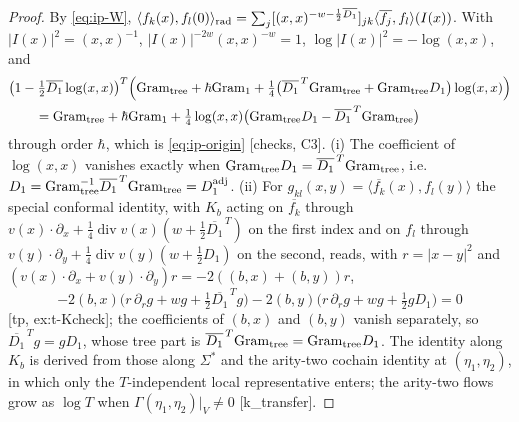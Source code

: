\documentclass[11pt]{report}
\theoremstyle{plain}
\theoremstyle{definition}
\numberwithin{equation}{chapter}
\newcommand{\Gt}{\mathrm{Gram}_{\rm tree}}
\newcommand{\Go}{\mathrm{Gram}_{1}}
\newcommand{\rad}{{\rm rad}}
\begin{document}
\begin{proof}
By \eqref{eq:ip-W}, $\langle f_k(x),f_l(0)\rangle_\rad=\sum_j[(x,x)^{-w-\frac12\overline{D_1}}]_{jk}\langle\overline{f_j},f_l\rangle(I(x))$. With $|I(x)|^2=(x,x)^{-1}$, $|I(x)|^{-2w}(x,x)^{-w}=1$, $\log|I(x)|^2=-\log(x,x)$, and
\[
\begin{aligned}
&\big(1-\tfrac12\overline{D_1}\log(x,x)\big)^T\Big(\Gt+\hbar\Go+\tfrac14\big(\overline{D_1}^{\,T}\Gt+\Gt D_1\big)\log(x,x)\Big)\\
&\qquad=\Gt+\hbar\Go+\tfrac14\log(x,x)\big(\Gt D_1-\overline{D_1}^{\,T}\Gt\big)
\end{aligned}
\]
through order $\hbar$, which is \eqref{eq:ip-origin} [checks, C3]. (i) The coefficient of $\log(x,x)$ vanishes exactly when $\Gt D_1=\overline{D_1}^{\,T}\Gt$, i.e. $D_1=\Gt^{-1}\overline{D_1}^{\,T}\Gt=D_1^{\rm adj}$. (ii) For $g_{kl}(x,y)=\langle\overline{f_k}(x),f_l(y)\rangle$ the special conformal identity, with $K_b$ acting on $\overline{f_k}$ through $v(x)\cdot\partial_x+\tfrac14\operatorname{div}v(x)(w+\tfrac12\overline{D_1}^{\,T})$ on the first index and on $f_l$ through $v(y)\cdot\partial_y+\tfrac14\operatorname{div}v(y)(w+\tfrac12D_1)$ on the second, reads, with $r=|x-y|^2$ and $(v(x)\cdot\partial_x+v(y)\cdot\partial_y)r=-2((b,x)+(b,y))r$,
\[
-2(b,x)\big(r\,\partial_rg+wg+\tfrac12\overline{D_1}^{\,T}g\big)-2(b,y)\big(r\,\partial_rg+wg+\tfrac12gD_1\big)=0
\]
[tp, ex:t-Kcheck]; the coefficients of $(b,x)$ and $(b,y)$ vanish separately, so $\overline{D_1}^{\,T}g=gD_1$, whose tree part is $\overline{D_1}^{\,T}\Gt=\Gt D_1$. The identity along $K_b$ is derived from those along $\Sigma^*$ and the arity-two cochain identity at $(\eta_1,\eta_2)$, in which only the $T$-independent local representative enters; the arity-two flows grow as $\log T$ when $\Gamma(\eta_1,\eta_2)|_V\neq0$ [k\_transfer].
\end{proof}
\end{document}
